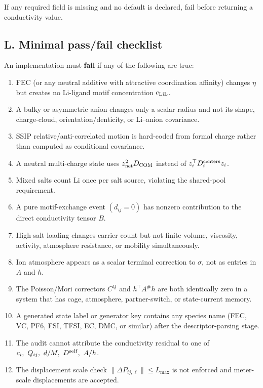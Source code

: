 \documentclass[11pt]{article}
\begin{document}
If any required field is missing and no default is declared, fail before
returning a conductivity value.

\subsection{L. Minimal pass/fail checklist}

An implementation must \textbf{fail} if any of the following are true:

\begin{enumerate}
\item FEC (or any neutral additive with attractive coordination affinity)
changes \(\eta\) but creates no Li-ligand motif concentration
\(c_{\rm LiL}\).
\item A bulky or asymmetric anion changes only a scalar radius and not its
shape, charge-cloud, orientation/denticity, or Li--anion covariance.
\item SSIP relative/anti-correlated motion is hard-coded from formal charge
rather than computed as conditional covariance.
\item A neutral multi-charge state uses \(z_{\rm net}^2 D_{\rm COM}\) instead
of \(z_i^\top D_i^{\rm centers} z_i\).
\item Mixed salts count Li once per salt source, violating the shared-pool
requirement.
\item A pure motif-exchange event \((d_{ij}=0)\) has nonzero contribution to
the direct conductivity tensor \(B\).
\item High salt loading changes carrier count but not finite volume, viscosity,
activity, atmosphere resistance, or mobility simultaneously.
\item Ion atmosphere appears as a scalar terminal correction to \(\sigma\),
not as entries in \(A\) and \(h\).
\item The Poisson/Mori correctors \(C^Q\) and \(h^\top A^\# h\) are both
identically zero in a system that has cage, atmosphere, partner-switch,
or state-current memory.
\item A generated state label or generator key contains any species name
(FEC, VC, PF6, FSI, TFSI, EC, DMC, or similar) after the descriptor-parsing
stage.
\item The audit cannot attribute the conductivity residual to one of
\(c_i,\ Q_{ij},\ d/M,\ D^{\rm self},\ A/h\).
\item The displacement scale check \(\|\Delta P_{ij,\ell}\|\le L_{\max}\)
is not enforced and meter-scale displacements are accepted.
\end{enumerate}
\end{document}
